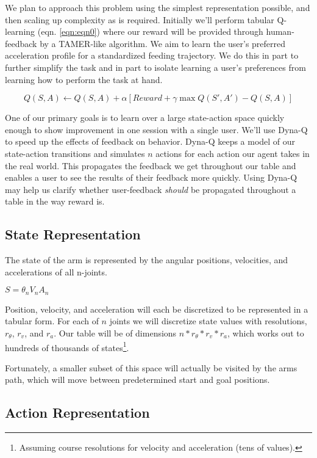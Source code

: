 \documentclass{article}
\begin{document}
We plan to approach this problem using the simplest representation possible, and then scaling up complexity as is required. Initially we'll perform tabular Q-learning (eqn. \ref{eqn:eqn0}) where our reward will be provided through human-feedback by a TAMER-like algorithm. We aim to learn the user's preferred acceleration profile for a standardized feeding trajectory. We do this in part to further simplify the task and in part to isolate learning a user's preferences from learning how to perform the task at hand. 

\begin{equation}
    \label{eqn:eqn0}
    Q(S,A) \leftarrow Q(S,A) + \alpha [Reward + \gamma \max Q(S',A') - Q(S,A)] 
\end{equation}

One of our primary goals is to learn over a large state-action space quickly enough to show improvement in one session with a single user. We'll use Dyna-Q \cite{sutton_introduction_1998} to speed up the effects of feedback on behavior. Dyna-Q keeps a model of our state-action transitions and simulates $n$ actions for each action our agent takes in the real world. This propagates the feedback we get throughout our table and enables a user to see the results of their feedback more quickly. Using Dyna-Q may help us clarify whether user-feedback \textit{should} be propagated throughout a table in the way reward is. 

\subsection{State Representation}

The state of the arm is represented by the angular positions, velocities, and accelerations of all n-joints. 

$S = {\theta_n V_n A_n}$

Position, velocity, and acceleration will each be discretized to be represented in a tabular form. For each of $n$ joints we will discretize state values with resolutions, $r_\theta$, $r_v$, and $r_a$. Our table will be of dimensions $n*r_\theta*r_v*r_a$, which works out to hundreds of thousands of states\footnote{Assuming course resolutions for velocity and acceleration (tens of values).}. 

Fortunately, a smaller subset of this space will actually be visited by the arms path, which will move between predetermined start and goal positions.

\subsection{Action Representation}
\end{document}
